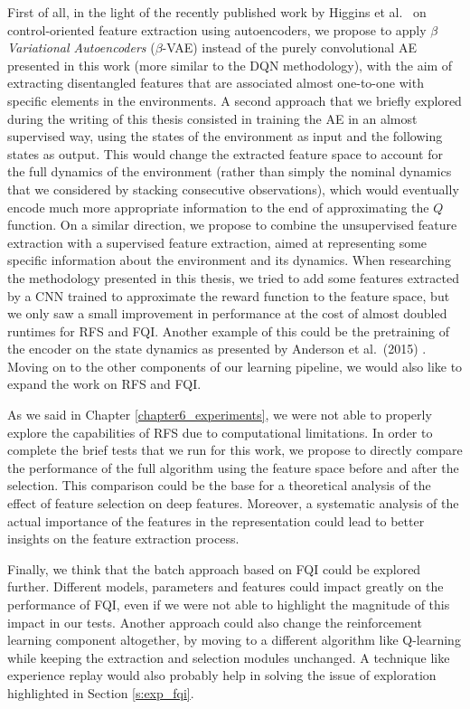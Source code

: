 First of all, in the light of the recently published work by Higgins et al.\ \cite{higgins2017darla}
on control-oriented feature extraction using autoencoders, we propose to apply
\textit{$\beta$ Variational Autoencoders} ($\beta$-VAE) \cite{kingma2014auto, higgins2017beta} 
instead of the purely convolutional AE presented in this work (more similar to 
the DQN methodology), with the aim of extracting disentangled features that
are associated almost one-to-one with specific elements in the environments.
A second approach that we briefly explored during the writing of this thesis 
consisted in training the AE in an almost supervised way, using the states of 
the environment as input and the following states as output. 
This would change the extracted feature space to account for the full dynamics 
of the environment (rather than simply the nominal dynamics that we considered 
by stacking consecutive observations), which would eventually 
encode much more appropriate information to the end of approximating the $Q$ 
function. 
On a similar direction, we propose to combine the unsupervised feature 
extraction with a supervised feature extraction, aimed at representing some 
specific information about the environment and its dynamics. 
When researching the methodology presented in this thesis, we tried to add some 
features extracted by a CNN trained to approximate the reward function to the 
feature space, but we only saw a small improvement in performance at the cost of
almost doubled runtimes for RFS and FQI. 
Another example of this could be the pretraining of the encoder on the state 
dynamics as presented by Anderson et al.\ (2015) \cite{anderson2015faster}.
Moving on to the other components of our learning pipeline, we would also like 
to expand the work on RFS and FQI. 

As we said in Chapter \ref{chapter6_experiments}, we were not able to properly 
explore the capabilities of RFS due to computational limitations.
In order to complete the brief tests that we run for this work, we propose to
directly compare the performance of the full algorithm using the feature space
before and after the selection. 
This comparison could be the base for a theoretical analysis of the
effect of feature selection on deep features. Moreover, a systematic analysis
of the actual importance of the features in the representation could lead
to better insights on the feature extraction process. 

Finally, we think that the batch approach based on FQI could be explored further. 
Different models, parameters and features could impact greatly 
on the performance of FQI, even if we were not able to highlight the 
magnitude of this impact in our tests. 
Another approach could also change the reinforcement learning component 
altogether, by moving to a different algorithm like Q-learning while keeping
the extraction and selection modules unchanged. A technique like experience 
replay would also probably help in solving the issue of exploration highlighted 
in Section \ref{s:exp_fqi}.

